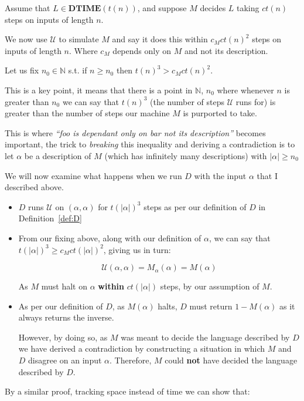 \documentclass{article}
\newcommand{\N}{\mathbb{N}}
\begin{document}
Assume that $L \in \mathbf{DTIME}(t(n))$, and suppose $M$ decides $L$ taking $ct(n)$ steps on inputs of length $n$.

We now use $\mathcal{U}$ to simulate $M$ and say it does this within $c_{M}ct(n)^{2}$ steps on inputs of length $n$. Where $c_{M}$ depends only on $M$ and not its description.

Let us fix $n_{0} \in \N$ s.t. if $n \geq n_{0}$ then $t(n)^{3} > c_{M}ct(n)^{2}$.

This is a key point, it means that there is a point in $\N$, $n_{0}$ where whenever $n$ is greater than $n_{0}$ we can say that $t(n)^{3}$ (the number of steps $\mathcal{U}$ runs for) is greater than the number of steps our machine $M$ is purported to take.

This is where \textit{``foo is dependant only on bar not its description''} becomes important, the trick to \textit{breaking} this inequality and deriving a contradiction is to let \(\alpha\) be a description of $M$ (which has infinitely many descriptions) with $|\alpha| \geq n_{0}$

We will now examine what happens when we run $D$ with the input \(\alpha\) that I described above.

\begin{itemize}
  \item $D$ runs $\mathcal{U}$ on $(\alpha,\alpha)$ for $t(|\alpha|)^{3}$ steps as per our definition of $D$ in Definition~\ref{def:D}
  \item From our fixing above, along with our definition of \(\alpha\), we can say that $t(|\alpha|)^{3} \geq c_{M}ct(|\alpha|)^{2}$, giving us in turn:

        \[
        \mathcal{U}(\alpha,\alpha) = M_{\alpha}(\alpha) = M(\alpha)
        \]

        As $M$ must halt on \(\alpha\) \textbf{within} $ct(|\alpha|)$ steps, by our assumption of $M$.

  \item As per our definition of $D$, as $M(\alpha)$ halts, $D$ must return $1-M(\alpha)$ as it always returns the inverse.

        However, by doing so, as $M$ was meant to decide the language described by $D$ we have derived a contradiction by constructing a situation in which $M$ and $D$ disagree on an input \(\alpha\). Therefore, $M$ could \textbf{not} have decided the language described by $D$.
\end{itemize}

By a similar proof, tracking space instead of time we can show that:
\end{document}
